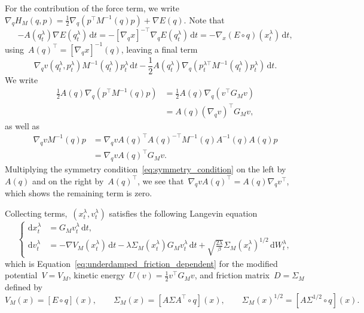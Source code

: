 \documentclass[10pt]{article}
\renewcommand{\d}{\mathrm{d}}
\newcommand{\1}{\mathbbm 1}
\begin{document}
For the contribution of the force term, we write~$\nabla_q H_M(q,p) = \frac12 \nabla_q\left(p^\top M^{-1}(q)p\right) + \nabla E(q)$. Note that
\begin{equation}
    -A(q_t^\lambda)\nabla E(q_t^\lambda)\,\d t = -\left[\nabla_q x\right]^{-\top}\nabla_q E(q_t^\lambda)\,\d t = -\nabla_x\left(E\circ q\right)(x_t^\lambda)\,\d t,
\end{equation}
using~$A(q)^\top = \left[\nabla_q x\right]^{-1}(q)$, leaving a final term
\begin{equation}
    \nabla_q v(q_t^\lambda,p_t^\lambda)M^{-1}(q_t^\lambda)p_t^\lambda\,\d t - \frac12 A(q_t^\lambda)\nabla_q\left(p_t^{\lambda\top} M^{-1}(q_t^\lambda)p_t^\lambda\right)\,\d t.
\end{equation}
We write
\begin{equation}
    \begin{aligned}
        \frac12 A(q)\nabla_q\left(p^\top M^{-1}(q)p\right) &= \frac12 A(q)\nabla_q\left(v^\top G_M v\right)\\
        &= A(q)\left(\nabla_q v\right)^\top G_M v,
    \end{aligned}
\end{equation}
as well as
\begin{equation}
    \begin{aligned}
        \nabla_q v M^{-1}(q)p &= \nabla_q v A(q)^\top A(q)^{-\top} M^{-1}(q)A^{-1}(q)A(q)p\\
        &= \nabla_q v A(q)^\top G_M v.
    \end{aligned}
\end{equation}
Multiplying the symmetry condition~\eqref{eq:symmetry_condition} on the left by~$A(q)$ and on the right by~$A(q)^\top$, we see that~$\nabla_q v A(q)^\top=A(q)\nabla_q v^\top$, which shows the remaining term is zero.

Collecting terms,~$(x_t^\lambda,v_t^\lambda)$ satisfies the  following Langevin equation
\begin{equation}
    \label{eq:final_equation}
    \left\{\begin{aligned}
    \d x_t^\lambda &= G_M v_t^\lambda\,\d t,\\
    \d v_t^\lambda &= -\nabla V_M(x_t^\lambda)\,\d t - \lambda\Sigma_M(x_t^\lambda) G_M v_t^\lambda\,\d t + \sqrt{\frac{2\lambda}{\beta}}\Sigma_M(x_t^\lambda)^{1/2}\,\d W_t^\lambda,
    \end{aligned}\right.
\end{equation}
which is Equation~\eqref{eq:underdamped_friction_dependent} for the modified potential~$V=V_M$, kinetic energy~$U(v)=\frac12 v^\top G_M v$, and friction matrix~$D=\Sigma_M$ defined by
\begin{equation}
    \label{eq:modified_coefficients}
    V_M(x) = \left[E\circ q\right](x),\qquad \Sigma_M(x) = \left[A\Sigma A^\top\circ q\right](x),\qquad \Sigma_M(x)^{1/2} = \left[A\Sigma^{1/2}\circ q\right](x).
\end{equation}
\end{document}
